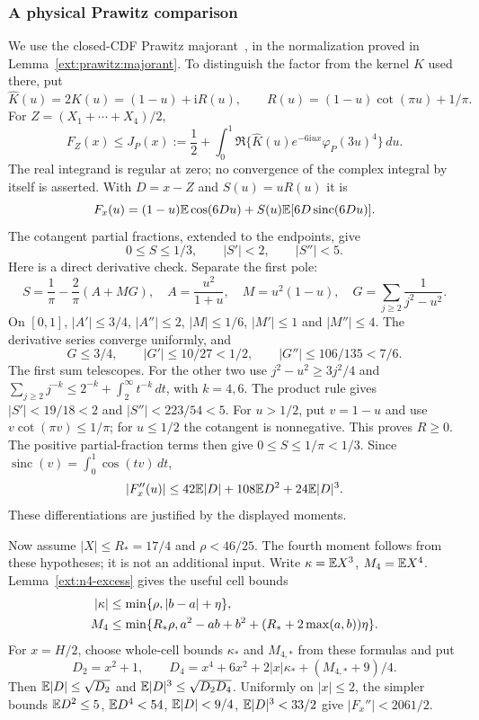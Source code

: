 \subsubsection{A physical Prawitz comparison}
We use the closed-CDF Prawitz majorant~\cite{Prawitz1972}, in the
normalization proved in Lemma~\ref{ext:prawitz:majorant}. To distinguish the
factor from the kernel $K$ used there, put
\[
 \widehat K(u)=2K(u)=(1-u)+\mathrm i R(u),\qquad
 R(u)=(1-u)\cot(\pi u)+1/\pi.
\]
For $Z=(X_1+\cdots+X_4)/2$,
\begin{equation}\label{ext:n4:eq:prawitz}
 F_Z(x)\le J_P(x):=\frac12+
 \int_0^1\Re\{\widehat K(u)e^{-6\mathrm i ux}\varphi_P(3u)^4\}\,du.
\end{equation}
The real integrand is regular at zero; no convergence of the complex
integral by itself is asserted. With $D=x-Z$ and $S(u)=uR(u)$ it is
\[
 F_x(u)=(1-u)\mathbb E\cos(6Du)+S(u)\mathbb E[6D\operatorname{sinc}(6Du)].
\]
The cotangent partial fractions, extended to the endpoints, give
\[
 0\le S\le1/3,\qquad |S'|<2,\qquad |S''|<5.
\]
Here is a direct derivative check. Separate the first pole:
\[
 S=\frac1\pi-\frac2\pi(A+MG),\quad
 A=\frac{u^2}{1+u},\quad M=u^2(1-u),\quad
 G=\sum_{j\ge2}\frac1{j^2-u^2}.
\]
On $[0,1]$, $|A'|\le3/4$, $|A''|\le2$, $|M|\le1/6$,
$|M'|\le1$ and $|M''|\le4$. The derivative series converge
uniformly, and
\[
 G\le3/4,\qquad |G'|\le10/27<1/2,\qquad
 |G''|\le106/135<7/6.
\]
The first sum telescopes. For the other two use
$j^2-u^2\ge3j^2/4$ and
$\sum_{j\ge2}j^{-k}\le2^{-k}+\int_2^\infty t^{-k}\,dt$,
with $k=4,6$. The product rule gives
$|S'|<19/18<2$ and $|S''|<223/54<5$.
For $u>1/2$, put $v=1-u$ and use
$v\cot(\pi v)\le1/\pi$; for $u\le1/2$ the cotangent is
nonnegative. This proves $R\ge0$. The positive partial-fraction
terms then give $0\le S\le1/\pi<1/3$.
Since $\operatorname{sinc}(v)=\int_0^1\cos(tv)\,dt$,
\begin{equation}\label{ext:n4:eq:integrand-curvature}
 |F_x''(u)|\le42\mathbb E|D|+108\mathbb E D^2+24\mathbb E|D|^3.
\end{equation}
These differentiations are justified by the displayed moments.

Now assume $|X|\le R_*=17/4$ and $\rho<46/25$.
The fourth moment follows from these hypotheses; it is not an
additional input. Write $\kappa=\mathbb E X^3$, $M_4=\mathbb E X^4$.
Lemma~\ref{ext:n4-excess} gives the useful cell bounds
\begin{align}
 |\kappa|&\le\min\{\rho,|b-a|+\eta\},\notag\\
 M_4&\le\min\{R_*\rho, a^2-ab+b^2+
                         (R_*+2\max(a,b))\eta\}.
 \label{ext:n4:eq:local-moments}
\end{align}
For $x=H/2$, choose whole-cell bounds $\kappa_*$ and $M_{4,*}$
from these formulas and put
\[
 D_2=x^2+1,\qquad
 D_4=x^4+6x^2+2|x|\kappa_*+(M_{4,*}+9)/4.
\]
Then $\mathbb E|D|\le\sqrt{D_2}$ and
$\mathbb E|D|^3\le\sqrt{D_2D_4}$. Uniformly on $|x|\le2$, the simpler
bounds $\mathbb E D^2\le5$, $\mathbb E D^4<54$, $\mathbb E|D|<9/4$,
$\mathbb E|D|^3<33/2$ give $|F_x''|<2061/2$.

